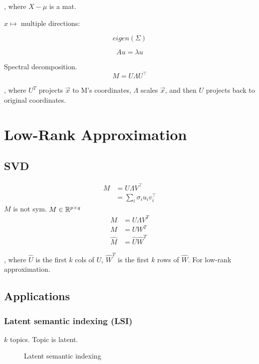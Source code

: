 \documentclass[a4paper]{report}
\begin{document}
, where $X-\mu$ is a mat. 

$x \mapsto$ multiple directions:

$$
eigen(\Sigma)
$$

$$
Au = \lambda u
$$

Spectral decomposition. 
$$
M = U\Lambda U^\top
$$

, where $U^T$ projects $\vec x$ to M's coordinates, $\Lambda$ scales $\vec x$, and then  $U$ projects back to original coordinates.
\section{Low-Rank Approximation}
\subsection{SVD}
\begin{align*}
M &= U\Lambda V^\top  \\
&= \sum_i \sigma_i u_i v_i^\top
\end{align*}
$M$ is not sym. $M\in \mathbb{R}^{p\times q}$
\begin{align*}
M &= U \Lambda V^T \\
M &=UW^T \\
\hat M &=\hat U \hat W^T
\end{align*}

, where $\hat U$ is the first $k$ cols of $U$, $\hat W^T$ is the first $k$ rows of $\hat W$. For low-rank approximation. 

\subsection{Applications}
\subsubsection{Latent semantic indexing (LSI)}
$k$ topics. Topic is latent.

\begin{figure}[!htp]
\centering
{}
\caption{Latent semantic indexing}
\label{fig:lsi}
\end{figure}
\end{document}
